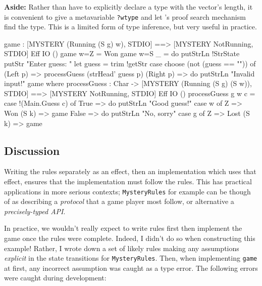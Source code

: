 \noindent
\textbf{Aside:} 
Rather than have to explicitly declare a type with the vector's length, it
is convenient to give a metavariable \texttt{?wtype} and let \Idris{}'s
proof search mechanism find the type. This is a limited form of type
inference, but very useful in practice.

\begin{code}[float=h,frame=single,caption={Mystery Word Game Implementation},label=mword]
game : { [MYSTERY (Running (S g) w), STDIO] ==>
         [MYSTERY NotRunning, STDIO] } Eff IO ()
game {w=Z} = Won
game {w=S _}
     = do putStrLn !StrState
          putStr "Enter guess: "
          let guess = trim !getStr
          case choose (not (guess == "")) of
               (Left p) => processGuess (strHead' guess p)
               (Right p) => do putStrLn "Invalid input!"
                               game
  where
    processGuess : Char -> { [MYSTERY (Running (S g) (S w)), STDIO] ==>
                             [MYSTERY NotRunning, STDIO] }
                           Eff IO ()
    processGuess {g} {w} c
      = case !(Main.Guess c) of
             True => do putStrLn "Good guess!"
                        case w of
                             Z => Won
                             (S k) => game
             False => do putStrLn "No, sorry"
                         case g of
                              Z => Lost
                              (S k) => game
\end{code}

\subsection{Discussion}

Writing the rules separately as an effect, then an implementation which uses
that effect, ensures that the implementation must follow the rules. This has
practical applications in more serious contexts; \texttt{MysteryRules} for
example can be though of as describing a \emph{protocol} that a game
player most follow, or alternative a \emph{precisely-typed API}.

In practice, we wouldn't really expect to write rules first then implement
the game once the rules were complete. Indeed, I didn't do so when constructing
this example! Rather, I wrote down a set of likely rules making 
any assumptions \emph{explicit} in the state transitions for \texttt{MysteryRules}. 
Then, when implementing \texttt{game} at
first, any incorrect assumption was caught as a type error. The following
errors were caught during development:

